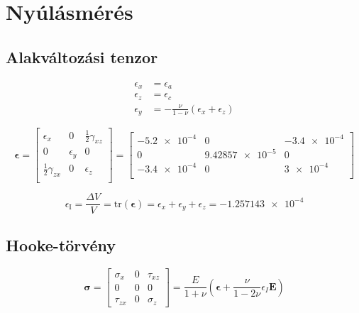 \section{Nyúlásmérés}

\subsection{Alakváltozási tenzor}
\begin{align*}
	\epsilon_x &= \epsilon_a \\
	\epsilon_z &= \epsilon_c \\
	\epsilon_y &= -\frac{\nu}{1-\nu}(\epsilon_x + \epsilon_z)
\end{align*}

\begin{equation*}
	\pmb{\epsilon} = \begin{bmatrix}
		\epsilon_x & 0 & \frac{1}{2}\gamma_{xz} \\
		0 & \epsilon_y & 0 \\
		\frac{1}{2}\gamma_{zx} & 0 & \epsilon_z \\
	\end{bmatrix} = \begin{bmatrix}
		\num{-5.2e-4} & 0 & \num{-3.4e-4} \\
		0 & \num{9.42857e-5} & 0 \\
		\num{-3.4e-4} & 0 & \num{3e-4} \\
	\end{bmatrix}
\end{equation*}

\begin{equation*}
	\epsilon_\text{I} = \frac{\Delta V}{V} = \text{tr}(\pmb{\epsilon}) = \epsilon_x + \epsilon_y + \epsilon_z = \num{-1.257143e-4}
\end{equation*}

\subsection{Hooke-törvény}

\begin{equation*}
	\pmb{\sigma} = \begin{bmatrix}
		\sigma_x & 0 & \tau_{xz} \\
		0 & 0 & 0 \\
		\tau_{zx} & 0 & \sigma_z
	\end{bmatrix} = \frac{E}{1+\nu}\left(\pmb{\epsilon} + \frac{\nu}{1-2\nu} \epsilon_I \pmb{E}\right)
\end{equation*}

